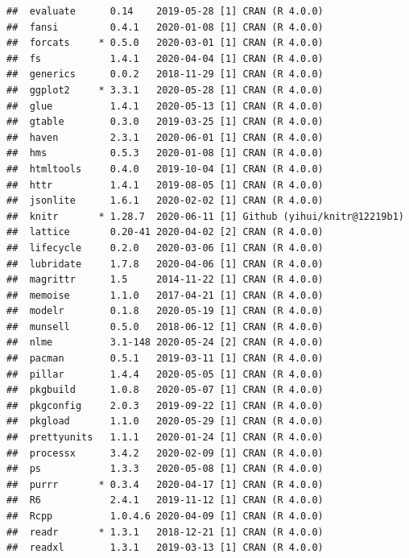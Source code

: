 \documentclass[
  12pt,
]{krantz}
\begin{document}
\begin{verbatim}
##  evaluate      0.14    2019-05-28 [1] CRAN (R 4.0.0)                   
##  fansi         0.4.1   2020-01-08 [1] CRAN (R 4.0.0)                   
##  forcats     * 0.5.0   2020-03-01 [1] CRAN (R 4.0.0)                   
##  fs            1.4.1   2020-04-04 [1] CRAN (R 4.0.0)                   
##  generics      0.0.2   2018-11-29 [1] CRAN (R 4.0.0)                   
##  ggplot2     * 3.3.1   2020-05-28 [1] CRAN (R 4.0.0)                   
##  glue          1.4.1   2020-05-13 [1] CRAN (R 4.0.0)                   
##  gtable        0.3.0   2019-03-25 [1] CRAN (R 4.0.0)                   
##  haven         2.3.1   2020-06-01 [1] CRAN (R 4.0.0)                   
##  hms           0.5.3   2020-01-08 [1] CRAN (R 4.0.0)                   
##  htmltools     0.4.0   2019-10-04 [1] CRAN (R 4.0.0)                   
##  httr          1.4.1   2019-08-05 [1] CRAN (R 4.0.0)                   
##  jsonlite      1.6.1   2020-02-02 [1] CRAN (R 4.0.0)                   
##  knitr       * 1.28.7  2020-06-11 [1] Github (yihui/knitr@12219b1)     
##  lattice       0.20-41 2020-04-02 [2] CRAN (R 4.0.0)                   
##  lifecycle     0.2.0   2020-03-06 [1] CRAN (R 4.0.0)                   
##  lubridate     1.7.8   2020-04-06 [1] CRAN (R 4.0.0)                   
##  magrittr      1.5     2014-11-22 [1] CRAN (R 4.0.0)                   
##  memoise       1.1.0   2017-04-21 [1] CRAN (R 4.0.0)                   
##  modelr        0.1.8   2020-05-19 [1] CRAN (R 4.0.0)                   
##  munsell       0.5.0   2018-06-12 [1] CRAN (R 4.0.0)                   
##  nlme          3.1-148 2020-05-24 [2] CRAN (R 4.0.0)                   
##  pacman        0.5.1   2019-03-11 [1] CRAN (R 4.0.0)                   
##  pillar        1.4.4   2020-05-05 [1] CRAN (R 4.0.0)                   
##  pkgbuild      1.0.8   2020-05-07 [1] CRAN (R 4.0.0)                   
##  pkgconfig     2.0.3   2019-09-22 [1] CRAN (R 4.0.0)                   
##  pkgload       1.1.0   2020-05-29 [1] CRAN (R 4.0.0)                   
##  prettyunits   1.1.1   2020-01-24 [1] CRAN (R 4.0.0)                   
##  processx      3.4.2   2020-02-09 [1] CRAN (R 4.0.0)                   
##  ps            1.3.3   2020-05-08 [1] CRAN (R 4.0.0)                   
##  purrr       * 0.3.4   2020-04-17 [1] CRAN (R 4.0.0)                   
##  R6            2.4.1   2019-11-12 [1] CRAN (R 4.0.0)                   
##  Rcpp          1.0.4.6 2020-04-09 [1] CRAN (R 4.0.0)                   
##  readr       * 1.3.1   2018-12-21 [1] CRAN (R 4.0.0)                   
##  readxl        1.3.1   2019-03-13 [1] CRAN (R 4.0.0)                   

\end{verbatim}
\end{document}
